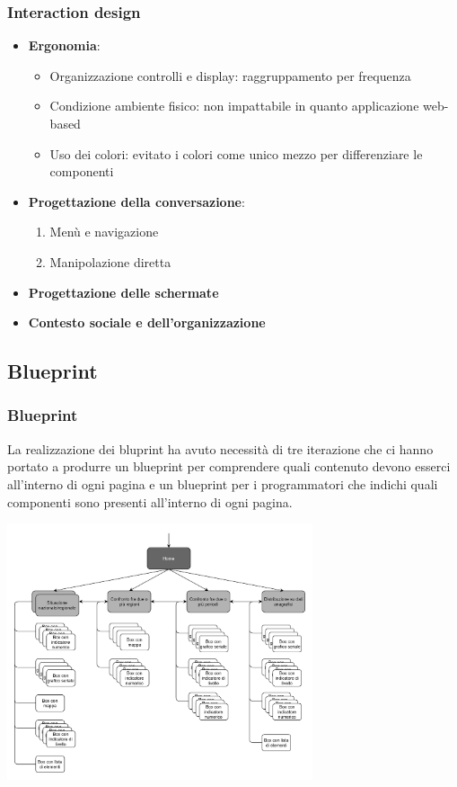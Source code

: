 \documentclass[handout]{beamer}
\begin{document}
		\begin{frame}
			\frametitle{Interaction design}		
			\begin{itemize}[<+->]
				\item \textbf{Ergonomia}:
				\begin{itemize}[<+->]
					\item Organizzazione controlli e display: raggruppamento per frequenza\\
					\item Condizione ambiente fisico: non impattabile in quanto applicazione web-based\\
					\item Uso dei colori: evitato i colori come unico mezzo per differenziare le componenti\\
				\end{itemize} 
				\item \textbf{Progettazione della conversazione}:
					\begin{enumerate}[<+->]
						\item Menù e navigazione
						\item Manipolazione diretta
					\end{enumerate}
				\item \textbf{Progettazione delle schermate}
				\item \textbf{Contesto sociale e dell'organizzazione}
			\end{itemize}
		\end{frame}

		\subsection{Blueprint}
		\begin{frame}
			\frametitle{Blueprint}
			La realizzazione dei bluprint ha avuto necessità di tre iterazione che ci hanno portato a produrre un blueprint per comprendere quali contenuto devono esserci all'interno di ogni pagina e un blueprint per i programmatori che indichi quali componenti sono presenti all'interno di ogni pagina.
		\end{frame}

		\begin{frame}
			\includegraphics[width=9cm]{img/blueprint-prog-1}
		\end{frame}
\end{document}
